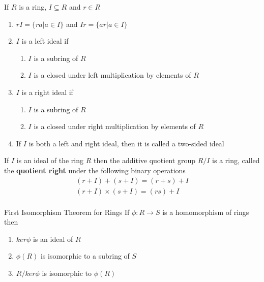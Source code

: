 \documentclass[titlepage, 12pt]{book}
\begin{document}
\begin{definition}
    If $R$ is a ring, $I\subseteq R$ and $r\in R$
    \begin{enumerate}
        \item $rI = \{ra|a\in I\}$ and $Ir = \{ar|a\in I\}$
        \item $I$ is a left ideal if
            \begin{enumerate}
                \item $I$ is a subring of $R$
                \item $I$ is a closed under left multiplication by elements of $R$
            \end{enumerate}
        \item $I$ is a right ideal if
            \begin{enumerate}
                \item $I$ is a subring of $R$
                \item $I$ is a closed under right multiplication by elements of $R$
            \end{enumerate}
        \item If $I$ is both a left and right ideal, then it is called a
            two-sided ideal
    \end{enumerate}
\end{definition}

\begin{proposition}{}{}
    If $I$ is an ideal of the ring $R$ then the additive quotient group $R/I$ is
    a ring, called the \textbf{quotient right} under the following binary
    operations
    \begin{gather*}
        (r + I) + (s + I) = (r + s) + I\\
        (r + I) \times (s + I) = (rs) + I\\
    \end{gather*}
\end{proposition}

\begin{theorem}{First Isomorphism Theorem for Rings}{}
    If $\phi:R\rightarrow S$ is a homomorphism of rings then
    \begin{enumerate}
        \item $ker\phi$ is an ideal of $R$
        \item $\phi(R)$ is isomorphic to a subring of $S$
        \item $R/ker\phi$ is isomorphic to $\phi(R)$
    \end{enumerate}
\end{theorem}
\end{document}
